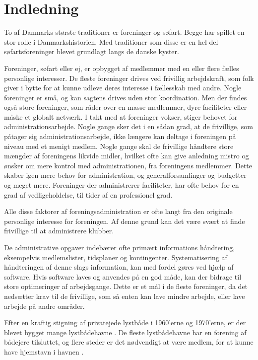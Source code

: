 \chapter{Indledning}

To af Danmarks største traditioner er foreninger og søfart. Begge har spillet en stor rolle i Danmarkshistorien. Med traditioner som disse er en hel del søfartsforeninger blevet grundlagt langs de danske kyster. 

Foreninger, søfart eller ej, er opbygget af medlemmer med en eller flere fælles personlige interesser. De fleste foreninger drives ved frivillig arbejdskraft, som folk giver i bytte for at kunne udleve deres interesse i fællesskab med andre. Nogle foreninger er små, og kan sagtens drives uden stor koordination. Men der findes også store foreninger, som råder over en masse medlemmer, dyre faciliteter eller måske et globalt netværk. I takt med at foreninger vokser, stiger behovet for administrationsarbejde. Nogle gange sker det i en sådan grad, at de frivillige, som påtager sig administrationsarbejde, ikke længere kan deltage i foreningen på niveau med et menigt medlem. Nogle gange skal de frivillige håndtere store mængder af foreningens likvide midler, hvilket ofte kan give anledning mistro og ønsker om mere kontrol med administrationen, fra foreningens medlemmer. Dette skaber igen mere behov for administration, og generalforsamlinger og budgetter og meget mere. Foreninger der administrerer faciliteter, har ofte behov for en grad af vedligeholdelse, til tider af en professionel grad. 

Alle disse faktorer af foreningsadministration er ofte langt fra den originale personlige interesse for foreningen. Af denne grund kan det være svært at finde frivillige til at administrere klubber.

De administrative opgaver indebærer ofte primært informations håndtering, eksempelvis medlemslister, tidsplaner og kontingenter. Systematisering af håndteringen af denne slags information, kan med fordel gøres ved hjælp af software. Hvis software laves og anvendes på en god måde, kan der bidrage til store optimeringer af arbejdsgange. Dette er et mål i de fleste foreninger, da det nedsætter krav til de frivillige, som så enten kan lave mindre arbejde, eller lave arbejde på andre områder. 

Efter en kraftig stigning af privatejede lystbåde i 1960'erne og 1970'erne, er der blevet bygget mange lystbådehavne \cite{gyldendal_redaktionen_havn_2013}. De fleste lystbådehavne har en forening af bådejere tilsluttet, og flere steder er det nødvendigt at være medlem, for at kunne have hjemstavn i havnen \cite{int_vb_sl}.

